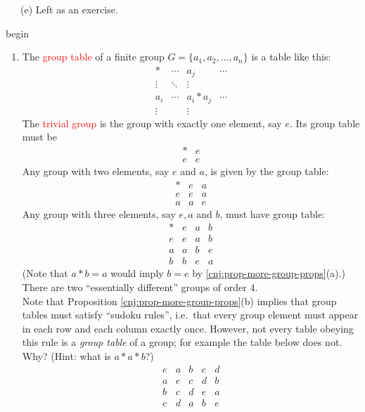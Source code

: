 \documentclass[
  12pt,
  a4paper,
  twoside]{article}
\theoremstyle{plain}
\theoremstyle{definition}
\begin{document}
\(\)~~~(e) Left as an exercise.

\csname begin\label{cnj:expl-groups-more}

\begin{enumerate}
\def\labelenumi{(\alph{enumi})}
\item
  The \textcolor{red}{group table} of a finite group \(G=\{a_1,a_2,\dots,a_n\}\) is a table like this:
  \[
  \begin{array}{c|ccc}
  \ast & \cdots & a_j & \cdots \\
  \hline
  \vdots & \ddots & \vdots & \\
  a_i & \cdots & a_i*a_j & \cdots\\
  \vdots &  & \vdots & 
  \end{array}
  \]
  The \textcolor{red}{trivial group} is the group with exactly one element, say \(e\). Its group table must be
  \[
  \begin{array}{c|c} * & e \\ \hline e & e\end{array}
  \]
  Any group with two elements, say \(e\) and \(a\), is given by the group table:
  \[
  \begin{array}{c|cc} * & e & a \\ \hline e & e & a \\ a & a & e\end{array}
  \]
  Any group with three elements, say \(e, a\) and \(b\), must have group table:
  \[
  \begin{array}{c|ccc} * & e & a & b \\ \hline e & e & a & b \\
  a & a & b & e \\ b & b & e & a\end{array}
  \]
  (Note that \(a*b=a\) would imply \(b=e\) by \ref{cnj:prop-more-group-props}(a).) There are two ``essentially different'' groups of order 4.\\
  Note that Proposition \ref{cnj:prop-more-group-props}(b) implies that group tables must satisfy ``sudoku rules'', i.e.~that every group element must appear in each row and each column exactly once. However, not every table obeying this rule is a \emph{group table} of a group; for example the table below does not. Why? (Hint: what is \(a*a*b\)?)
  \[
  \begin{array}{ccccc}
  e&a&b&c&d\\
  a&e&c&d&b\\
  b&c&d&e&a\\
  c&d&a&b&e\\

\end{array}\]
\end{enumerate}
\end{document}
